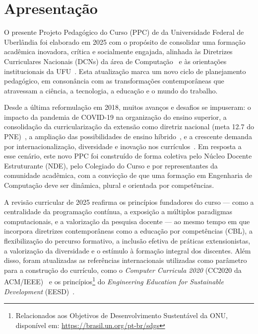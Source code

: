 \chapter{Apresentação}

O presente Projeto Pedagógico do Curso (PPC) de \ppccurso da Universidade Federal de Uberlândia foi elaborado em 2025 com o propósito de consolidar uma formação acadêmica inovadora, crítica e socialmente engajada, alinhada às Diretrizes Curriculares Nacionais (DCNs) da área de Computação~\cite{MEC:CNE:CES:5:2016} e às orientações institucionais da UFU~\cite{UFU:CONGRAD:15:2016,UFU:GuiaPPC:2021}. Esta atualização marca um novo ciclo de planejamento pedagógico, em consonância com as transformações contemporâneas que atravessam a ciência, a tecnologia, a educação e o mundo do trabalho.

Desde a última reformulação em 2018, muitos avanços e desafios se impuseram: o impacto da pandemia de COVID-19 na organização do ensino superior, a consolidação da curricularização da extensão como diretriz nacional (meta 12.7 do PNE)~\cite{mec2014pne,UFU:CONSUN:25:2019,UFU:CONGRAD:13:2019,UFU:CONSEX:5:2020}, a ampliação das possibilidades de ensino híbrido~\cite{Decreto:12456:2025}, e a crescente demanda por internacionalização, diversidade e inovação nos currículos~\cite{UFU:CONSUN:31:2022}. Em resposta a esse cenário, este novo PPC foi construído de forma coletiva pelo Núcleo Docente Estruturante (NDE), pelo Colegiado do Curso e por representantes da comunidade acadêmica, com a convicção de que uma formação em Engenharia de Computação deve ser dinâmica, plural e orientada por competências.

A revisão curricular de 2025 reafirma os princípios fundadores do curso — como a centralidade da programação contínua, a exposição a múltiplos paradigmas computacionais, e a valorização da pesquisa docente — ao mesmo tempo em que incorpora diretrizes contemporâneas como a educação por competências (CBL), a flexibilização do percurso formativo, a inclusão efetiva de práticas extensionistas, a valorização da diversidade e o estímulo à formação integral dos discentes. Além disso, foram atualizadas as referências internacionais utilizadas como parâmetro para a construção do currículo, como o \textit{Computer Curricula 2020} (CC2020 da ACM/IEEE)~\cite{ACM:CC2020} e os princípios\footnote{Relacionados aos Objetivos de Desenvolvimento Sustentável da ONU, disponível em: \url{https://brasil.un.org/pt-br/sdgs}} do \textit{Engineering Education for Sustainable Development} (EESD)~\cite{UNESCO:Eng4SusDev:2021}.

